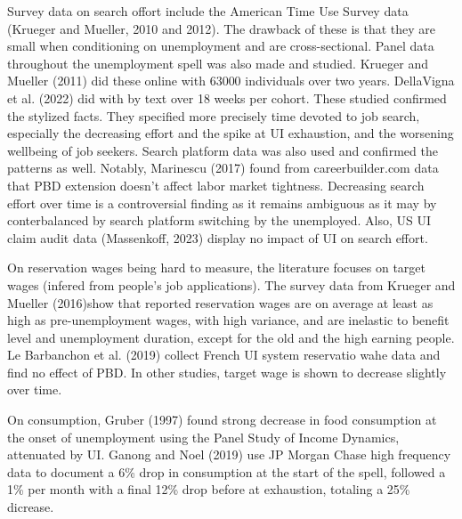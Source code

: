 \documentclass{article}
\begin{document}
Survey data on search offort include the American Time Use Survey data (Krueger and Mueller, 2010 and 2012). The drawback of these is that they are small when conditioning on unemployment and are cross-sectional. Panel data throughout the unemployment spell was also made and studied. Krueger and Mueller (2011) did these online with 63000 individuals over two years. DellaVigna et al. (2022) did with by text over 18 weeks per cohort. These studied confirmed the stylized facts. They specified more precisely time devoted to job search, especially the decreasing effort and the spike at UI exhaustion, and the worsening wellbeing of job seekers. Search platform data was also used and confirmed the patterns as well. Notably, Marinescu (2017) found from careerbuilder.com data that PBD extension doesn't affect labor market tightness. Decreasing search effort over time is a controversial finding as it remains ambiguous as it may by conterbalanced by search platform switching by the unemployed. Also, US UI claim audit data (Massenkoff, 2023) display no impact of UI on search effort.

On reservation wages being hard to measure, the literature focuses on target wages (infered from people's job applications). The survey data from Krueger and Mueller (2016)show that reported reservation wages are on average at least as high as pre-unemployment wages, with high variance, and are inelastic to benefit level and unemployment duration, except for the old and the high earning people. Le Barbanchon et al. (2019) collect French UI system reservatio wahe data and find no effect of PBD. In other studies, target wage is shown to decrease slightly over time.

On consumption, Gruber (1997) found strong decrease in food consumption at the onset of unemployment using the Panel Study of Income Dynamics, attenuated by UI. Ganong and Noel (2019) use JP Morgan Chase high frequency data to document a 6\% drop in consumption at the start of the spell, followed a 1\% per month with a final 12\% drop before at exhaustion, totaling a 25\% dicrease.
\end{document}
